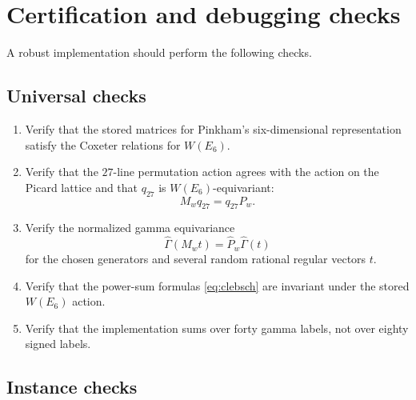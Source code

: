 \documentclass[11pt]{article}
\newcommand{\Gamhat}{\widehat{\Gamma}}
\begin{document}
\section{Certification and debugging checks}

A robust implementation should perform the following checks.

\subsection{Universal checks}

\begin{enumerate}
\item Verify that the stored matrices for Pinkham's six-dimensional representation
satisfy the Coxeter relations for $W(E_6)$.

\item Verify that the $27$-line permutation action agrees with the action on the
Picard lattice and that $q_{27}$ is $W(E_6)$-equivariant:
\[
  M_wq_{27}=q_{27}P_w.
\]

\item Verify the normalized gamma equivariance
\[
  \Gamhat(M_wt)=\widehat P_w\Gamhat(t)
\]
for the chosen generators and several random rational regular vectors $t$.

\item Verify that the power-sum formulas \eqref{eq:clebsch} are invariant under the
stored $W(E_6)$ action.

\item Verify that the implementation sums over forty gamma labels, not over eighty
signed labels.
\end{enumerate}

\subsection{Instance checks}
\end{document}
